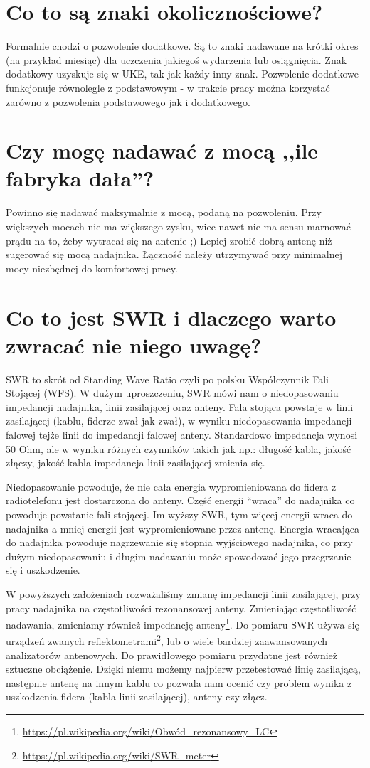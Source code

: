 \documentclass[a4paper,12pt]{article}
\begin{document}
\section{Co to są znaki okolicznościowe?}
Formalnie chodzi o pozwolenie dodatkowe. Są to znaki nadawane na krótki okres (na przykład miesiąc) dla uczczenia jakiegoś wydarzenia lub osiągnięcia. Znak dodatkowy uzyskuje się w UKE, tak jak każdy inny znak. Pozwolenie dodatkowe funkcjonuje równolegle z podstawowym - w trakcie pracy można korzystać zarówno z pozwolenia podstawowego jak i dodatkowego.

\section{Czy mogę nadawać z mocą ,,ile fabryka dała''?}
Powinno się nadawać maksymalnie z mocą, podaną na pozwoleniu. Przy większych mocach nie ma większego zysku, wiec nawet nie ma sensu marnować prądu na to, żeby wytracał się na antenie ;) Lepiej zrobić dobrą antenę niż sugerować się mocą nadajnika.
Łączność należy utrzymywać przy minimalnej mocy niezbędnej do komfortowej pracy. 

\section{Co to jest SWR i dlaczego warto zwracać nie niego uwagę?}
SWR to skrót od Standing Wave Ratio czyli po polsku Współczynnik Fali Stojącej (WFS). W dużym uproszczeniu, SWR mówi nam o niedopasowaniu impedancji nadajnika, linii zasilającej oraz anteny. Fala stojąca powstaje w linii zasilającej (kablu, fiderze zwał jak zwał), w wyniku niedopasowania impedancji falowej tejże linii do impedancji falowej anteny. Standardowo impedancja wynosi 50 Ohm, ale w wyniku różnych czynników takich jak np.: długość kabla, jakość złączy, jakość kabla impedancja linii zasilającej zmienia się. 

Niedopasowanie powoduje, że nie cała energia wypromieniowana do fidera z radiotelefonu jest dostarczona do anteny. Część energii “wraca” do nadajnika co powoduje powstanie fali stojącej. Im wyższy SWR, tym więcej energii wraca do nadajnika a mniej energii jest wypromieniowane przez antenę. Energia wracająca do nadajnika powoduje nagrzewanie się stopnia wyjściowego nadajnika, co przy dużym niedopasowaniu i długim nadawaniu może spowodować jego przegrzanie się i uszkodzenie.

W powyższych założeniach rozważaliśmy zmianę impedancji linii zasilającej, przy pracy nadajnika na częstotliwości rezonansowej anteny. Zmieniając częstotliwość nadawania, zmieniamy również impedancję anteny\footnote{\url{https://pl.wikipedia.org/wiki/Obwód_rezonansowy_LC}}.
Do pomiaru SWR używa się urządzeń zwanych reflektometrami\footnote{\url{https://pl.wikipedia.org/wiki/SWR_meter}}, lub o wiele bardziej zaawansowanych analizatorów antenowych.
Do prawidłowego pomiaru przydatne jest również sztuczne obciążenie. Dzięki niemu możemy najpierw przetestować linię zasilającą, następnie antenę na innym kablu co pozwala nam ocenić czy problem wynika z uszkodzenia fidera (kabla linii zasilającej), anteny czy złącz.
\end{document}
